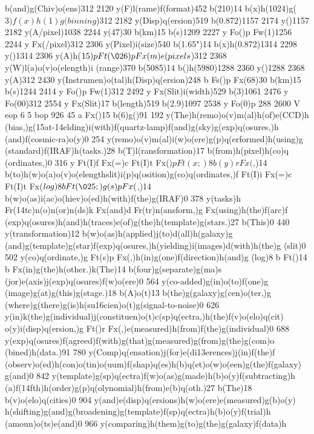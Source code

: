 {{{{{{{{b(and)g(Chiv)o(ens)312 2120 y(F)l(rame)f(format)452 b(210)14
b(x)h(1024)g(\(3)f(x)h(1)g(binning\))312 2182 y(Disp)q(ersion)519
b(0.872)1157 2174 y()1157 2182 y(A/pixel)1038 2244 y(47)30
b(km)15 b(s)1209 2227 y Fo()p Fw(1)1256 2244 y Fx(/pixel)312
2306 y(Pixel)i(size)540 b(1.65")14 b(x)h(0.872)1314 2298 y()1314
2306 y(A)h(\(15)p Ft(\026)p Fx(m)e(pixels\))312 2368 y(W)l(a)o(v)o(elength)i
(range)370 b(5085)14 b({)h(5980)1288 2360 y()1288 2368
y(A)312 2430 y(Instrumen)o(tal)h(Disp)q(ersion)248 b Fs()p
Fx(68)30 b(km)15 b(s)1244 2414 y Fo()p Fw(1)312 2492 y
Fx(Slit)i(width)529 b(3)1061 2476 y Fo(00)312 2554 y Fx(Slit)17
b(length)519 b(2.9)1097 2538 y Fo(0)p 288 2600 V eop
6 5 bop 926 45 a Fx({)15 b(6)g({)91 192 y(The)h(remo)o(v)m(al)h(of)e(CCD)h
(bias,)g(\015at-\014elding)i(with)f(quartz-lamp)f(and)g(sky)g(exp)q(osures,)h
(and)f(cosmic-ra)o(y)0 254 y(remo)o(v)m(al)i(w)o(ere)g(p)q(erformed)h(using)g
(standard)f(IRAF)h(tasks.)28 b(T)l(ransformation)17 b(from)h(pixel)h(co)q
(ordinates,)0 316 y Ft(I)f Fx(=)c Ft(I)t Fx(\()p Ft(x;)8 b(y)r
Fx(\),)14 b(to)h(w)o(a)o(v)o(elength{slit)i(p)q(osition)g(co)q(ordinates,)f
Ft(I)i Fx(=)c Ft(I)t Fx(\(log)8 b Ft(\025;)g(s)p Fx(\),)14
b(w)o(as)i(ac)o(hiev)o(ed)h(with)f(the)g(IRAF)0 378 y(tasks)h
Fr(\014tc)n(o)n(or)n(ds)k Fx(and)d Fr(tr)n(ansform,)g Fx(using)h(the)f(arc)f
(exp)q(osures)h(and)h(traces)e(of)g(the)h(template)g(stars.)27
b(This)0 440 y(transformation)12 b(w)o(as)h(applied)j(to)d(all)h(galaxy)g
(and)g(template)g(star)f(exp)q(osures,)h(yielding)i(images)d(with)h(the)g
(slit)0 502 y(co)q(ordinate,)g Ft(s)p Fx(,)h(in)g(one)f(direction)h(and)g
(log)8 b Ft()14 b Fx(in)g(the)h(other.)k(The)14 b(four)g(separate)g(ma)s
(jor)e(axis)j(exp)q(osures)f(w)o(ere)0 564 y(co-added)g(in)o(to)f(one)g
(image)g(at)g(this)g(stage.)18 b(A)o(t)13 b(the)g(galaxy)g(cen)o(ter,)g
(where)g(there)g(is)h(su\016cien)o(t)g(signal-to-noise)0 626
y(in)k(the)g(individual)j(constituen)o(t)c(sp)q(ectra,)h(the)f(v)o(elo)q(cit)
o(y)i(disp)q(ersion,)g Ft()r Fx(,)e(measured)h(from)f(the)g(individual)0
688 y(exp)q(osures)f(agreed)f(with)g(that)g(measured)g(from)g(the)g(com)o
(bined)h(data.)91 780 y(Comp)q(ensation)j(for)e(di\013erences)j(in)f(the)f
(observ)o(ed)h(con)o(tin)o(uum)f(shap)q(es)h(b)q(et)o(w)o(een)g(the)f(galaxy)
g(and)0 842 y(template)g(sp)q(ectra)f(w)o(as)g(made)h(b)o(y)f(subtracting)h
(a)f(\014fth)h(order)g(p)q(olynomial)h(from)e(b)q(oth.)27 b(The)18
b(v)o(elo)q(cities)0 904 y(and)e(disp)q(ersions)h(w)o(ere)e(measured)g(b)o(y)
h(shifting)g(and)g(broadening)g(template)f(sp)q(ectra)h(b)o(y)f(trial)h
(amoun)o(ts)e(and)0 966 y(comparing)h(them)g(to)g(the)g(galaxy)f(data)h
}}}}}}}}}}}}
